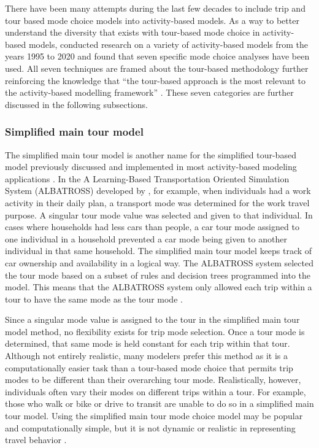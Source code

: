 \documentclass[3p, authoryear, review]{elsarticle} %
\begin{document}
There have been many attempts during the last few decades to include trip and tour based mode choice models into activity-based models. As a way to better understand the diversity that exists with tour-based mode choice in activity-based models, \citet{hasnine21} conducted research on a variety of activity-based models from the years 1995 to 2020 and found that seven specific mode choice analyses have been used. All seven techniques are framed about the tour-based methodology further reinforcing the knowledge that ``the tour-based approach is the most relevant to the activity-based modelling framework'' \citep{hasnine21}. These seven categories are further discussed in the following subsections.

\hypertarget{lit31}{%
\subsubsection{Simplified main tour model}\label{lit31}}

The simplified main tour model is another name for the simplified tour-based model previously discussed and implemented in most activity-based modeling applications \citep{arentze00, bowman01, pendyala97}. In the A Learning-Based Transportation Oriented Simulation System (ALBATROSS) developed by \citet{arentze00}, for example, when individuals had a work activity in their daily plan, a transport mode was determined for the work travel purpose. A singular tour mode value was selected and given to that individual. In cases where households had less cars than people, a car tour mode assigned to one individual in a household prevented a car mode being given to another individual in that same household. The simplified main tour model keeps track of car ownership and availability in a logical way. The ALBATROSS system selected the tour mode based on a subset of rules and decision trees programmed into the model. This means that the ALBATROSS system only allowed each trip within a tour to have the same mode as the tour mode \citep{arentze00}.

Since a singular mode value is assigned to the tour in the simplified main tour model method, no flexibility exists for trip mode selection. Once a tour mode is determined, that same mode is held constant for each trip within that tour. Although not entirely realistic, many modelers prefer this method as it is a computationally easier task than a tour-based mode choice that permits trip modes to be different than their overarching tour mode. Realistically, however, individuals often vary their modes on different trips within a tour. For example, those who walk or bike or drive to transit are unable to do so in a simplified main tour model. Using the simplified main tour mode choice model may be popular and computationally simple, but it is not dynamic or realistic in representing travel behavior \citep{hasnine21}.
\end{document}
